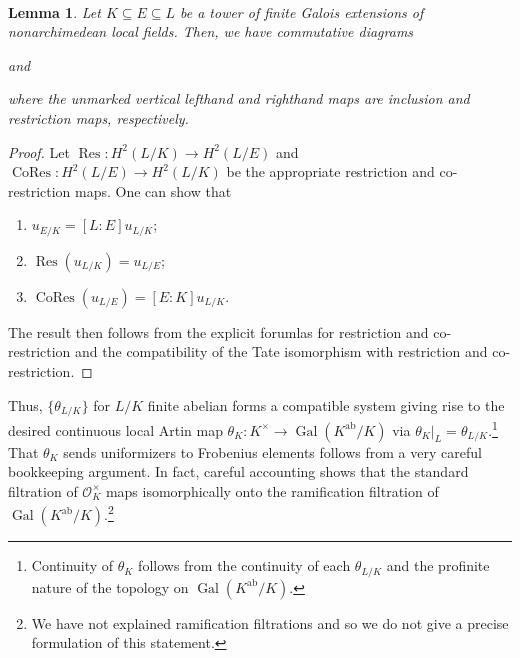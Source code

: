 \documentclass[11pt]{article}
\newcommand{\mc}[1]{\mathcal{#1}}
\DeclareMathOperator{\ab}{ab} %
\DeclareMathOperator{\CoRes}{CoRes} %
\DeclareMathOperator{\Gal}{Gal}
\DeclareMathOperator{\Res}{Res} %
\renewcommand{\subset}{\subseteq}
\renewcommand{\O}{\mc{O}}
\newenvironment{enum}[1]{
\begin{enumerate}[label=\textup{({#1*})}]
}
{
\end{enumerate}
}
\newtheorem*{lemma*}{\\Lemma}
\begin{document}
\begin{lemma*}
Let $K\subset E\subset L$ be a tower of finite Galois extensions of nonarchimedean local fields. Then, we have commutative diagrams
\begin{center}
\textrm{and}
\end{center}
where the unmarked vertical lefthand and righthand maps are inclusion and restriction maps, respectively.
\end{lemma*}
\begin{proof}
Let $\Res: H^2(L/K)\to H^2(L/E)$ and $\CoRes: H^2(L/E)\to H^2(L/K)$ be the appropriate restriction and co-restriction maps. One can show that 
\begin{enum}{\roman}
\item $u_{E/K}=[L:E]u_{L/K}$;
\item $\Res(u_{L/K})=u_{L/E}$;
\item $\CoRes(u_{L/E})=[E:K]u_{L/K}$.
\end{enum}
The result then follows from the explicit forumlas for restriction and co-restriction and the compatibility of the Tate isomorphism with restriction and co-restriction.
\end{proof}

Thus, $\{\theta_{L/K}\}$ for $L/K$ finite abelian forms a compatible system giving rise to the desired continuous local Artin map $\theta_K: K^{\times}\to\Gal(K^{\ab}/K)$ via $\theta_K|_L=\theta_{L/K}$.\footnote{Continuity of $\theta_K$ follows from the continuity of each $\theta_{L/K}$ and the profinite nature of the topology on $\Gal(K^{\ab}/K)$.} That $\theta_K$ sends uniformizers to Frobenius elements follows from a very careful bookkeeping argument. In fact, careful accounting shows that the standard filtration of $\O_K^{\times}$ maps isomorphically onto the ramification filtration of $\Gal(K^{\ab}/K)$.\footnote{We have not explained ramification filtrations and so we do not give a precise formulation of this statement.}
\end{document}
